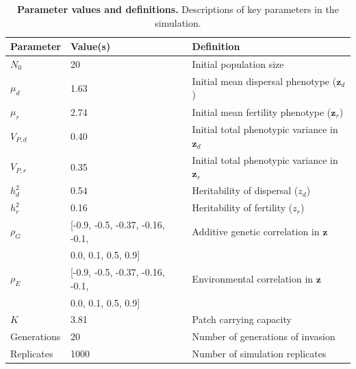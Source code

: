 \documentclass[11pt]{article}
\newcommand{\tom}[1]{{\textit{\color{WildStrawberry}{[#1]}}}}
\begin{document}
\renewcommand{\thetable}{A\arabic{table}}
\setcounter{table}{0}
\begin{table}[h]
\centering
\label{Parameter values and definitions}
\caption[Parameter values and definitions]{\textbf{Parameter values and definitions.} Descriptions of key parameters in the simulation. \tom{Need to update notation in this table.}}\label{corr:params}\vspace{0.1in}
\begin{tabularx}{0.95\linewidth}{llX}
\toprule
Parameter    & Value(s)                               & Definition                                        \\ \midrule
$N_{0}$      & 20                                     & Initial population size                           \\
$\mu_{d}$    & 1.63                                   & Initial mean dispersal phenotype ($\bm{z}_{d}$)   \\
$\mu_{r}$    & 2.74                                   & Initial mean fertility phenotype ($\bm{z}_{r}$) \\
$V_{P,d}$    & 0.40                                   & Initial total phenotypic variance in $\bm{z}_{d}$ \\
$V_{P,r}$    & 0.35                                   & Initial total phenotypic variance in $\bm{z}_{r}$ \\
$h^{2}_{d}$  & 0.54                                   & Heritability of dispersal ($z_d$)                 \\
$h^{2}_{r}$  & 0.16                                   & Heritability of fertility ($z_r$)               \\
$\rho_{G}$   & [-0.9, -0.5, -0.37, -0.16, -0.1,       & Additive genetic correlation in $\bm{z}$          \\
             & \phantom{$[-$}0.0, 0.1, 0.5, 0.9]      &                                                   \\
$\rho_{E}$   & [-0.9, -0.5, -0.37, -0.16, -0.1,       & Environmental correlation in $\bm{z}$             \\
             & \phantom{$[-$}0.0, 0.1, 0.5, 0.9]      &                                                   \\
$K$          & 3.81                                   & Patch carrying capacity                           \\
Generations  & 20                                     & Number of generations of invasion                 \\
Replicates   & 1000                                   & Number of simulation replicates                   \\ \bottomrule
\end{tabularx}
\end{table}

\newpage{}




\end{document}
